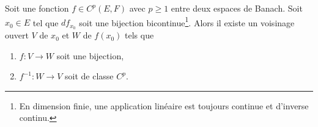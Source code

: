 \begin{theorem} \label{ThoXWpzqCn}
    Soit une fonction \( f\in C^p(E,F)\) avec \( p\geq 1\) entre deux espaces de Banach. Soit \( x_0\in E\) tel que \( df_{x_0}\) soit une bijection bicontinue\footnote{En dimension finie, une application linéaire est toujours continue et d'inverse continu.}. Alors il existe un voisinage ouvert \( V\) de \( x_0\) et \( W\) de \( f(x_0)\) tels que
    \begin{enumerate}
    \item
        \( f\colon V\to W\) soit une bijection,
    \item
        \( f^{-1}\colon W\to V\) soit de classe \( C^p\).
    \end{enumerate}
\end{theorem}

